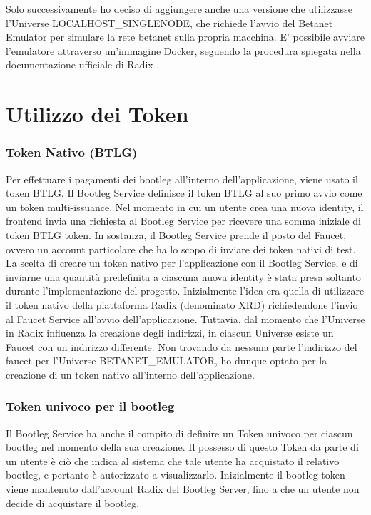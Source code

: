 Solo successivamente ho deciso di aggiungere anche una versione che utilizzasse l'Universe LOCALHOST\_SINGLENODE, che richiede l'avvio del Betanet Emulator per simulare la rete betanet sulla propria macchina. E' possibile avviare l'emulatore attraverso un'immagine Docker, seguendo la procedura spiegata nella documentazione ufficiale di Radix \cite{K29}. 

\section{Utilizzo dei Token}

\subsubsection{Token Nativo (BTLG)}

Per effettuare i pagamenti dei bootleg all'interno dell'applicazione, viene usato il token BTLG. Il Bootleg Service definisce il token BTLG al suo primo avvio come un token multi-issuance. Nel momento in cui un utente crea una nuova identity, il frontend invia una richiesta al Bootleg Service per ricevere una somma iniziale di token BTLG token. In sostanza, il Bootleg Service prende il posto del Faucet, ovvero un account particolare che ha lo scopo di inviare dei token nativi di test. La scelta di creare un token nativo per l'applicazione con il Bootleg Service, e di inviarne una quantità predefinita a ciascuna nuova identity è stata presa soltanto durante l'implementazione del progetto. Inizialmente l'idea era quella di utilizzare il token nativo della piattaforma Radix (denominato XRD) richiedendone l'invio al Faucet Service all'avvio dell'applicazione. Tuttavia, dal momento che l'Universe in Radix influenza la creazione degli indirizzi, in ciascun Universe esiste un Faucet con un indirizzo differente. Non trovando da nessuna parte l'indirizzo del faucet per l'Universe BETANET\_EMULATOR, ho dunque optato per la creazione di un token nativo all'interno dell'applicazione.

\subsubsection{Token univoco per il bootleg}

Il Bootleg Service ha anche il compito di definire un Token univoco per ciascun bootleg nel momento della sua creazione. Il possesso di questo Token da parte di un utente è ciò che indica al sistema che tale utente ha acquistato il relativo bootleg, e pertanto è autorizzato a visualizzarlo. Inizialmente il bootleg token viene mantenuto dall'account Radix del Bootleg Server, fino a che un utente non decide di acquistare il bootleg.

